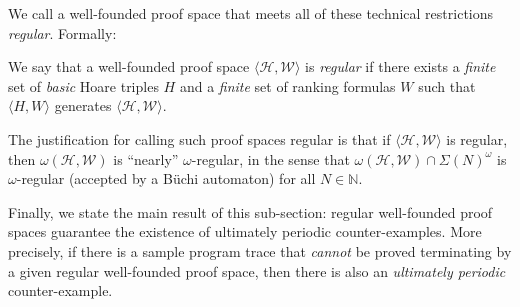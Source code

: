 \documentclass[9pt,nocopyrightspace]{sigplanconf}
\theoremstyle{definition}
\newcommand{\tuple}[1]{\langle #1 \rangle}
\begin{document}
We call a well-founded proof space that meets all of these technical
restrictions \emph{regular}.  Formally:
\begin{definition}[Regular] \label{def:finitely-generated} 
  We say that a well-founded proof space $\tuple{\mathscr{H},\mathscr{W}}$ is
  \emph{regular} if there exists a \emph{finite} set of \emph{basic} Hoare
  triples $H$ and a \emph{finite} set of ranking formulas $W$ such that
  $\tuple{H,W}$ generates $\tuple{\mathscr{H},\mathscr{W}}$.
\end{definition}

The justification for calling such proof spaces regular is that if
$\tuple{\mathscr{H},\mathscr{W}}$ is regular, then
$\omega(\mathscr{H},\mathscr{W})$ is ``nearly'' $\omega$-regular, in the sense
that $\omega(\mathscr{H},\mathscr{W}) \cap \Sigma(N)^\omega$ is
$\omega$-regular (accepted by a B\"{u}chi automaton) for all $N \in
\mathbb{N}$.





Finally, we state the main result of this sub-section: regular
well-founded proof spaces guarantee the existence of
ultimately periodic counter-examples.  More precisely, if there is a sample
program trace that \emph{cannot} be proved terminating by a given regular
well-founded proof space, then there is also an \emph{ultimately
  periodic} counter-example.
\end{document}
